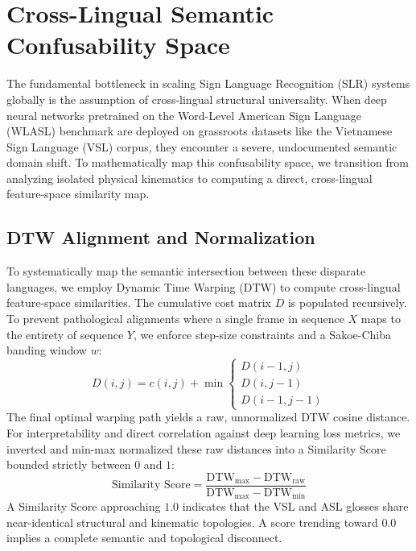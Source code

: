 \documentclass{ieeeaccess}
\begin{document}
\section{Cross-Lingual Semantic Confusability Space} \label{sec:similarity}

The fundamental bottleneck in scaling Sign Language Recognition (SLR) systems globally is the assumption of cross-lingual structural universality. When deep neural networks pretrained on the Word-Level American Sign Language (WLASL) benchmark are deployed on grassroots datasets like the Vietnamese Sign Language (VSL) corpus, they encounter a severe, undocumented semantic domain shift. To mathematically map this confusability space, we transition from analyzing isolated physical kinematics to computing a direct, cross-lingual feature-space similarity map.

\subsection{DTW Alignment and Normalization}
To systematically map the semantic intersection between these disparate languages, we employ Dynamic Time Warping (DTW) \cite{sakoe1978dynamic} to compute cross-lingual feature-space similarities. The cumulative cost matrix $D$ is populated recursively. To prevent pathological alignments where a single frame in sequence $X$ maps to the entirety of sequence $Y$, we enforce step-size constraints and a Sakoe-Chiba banding window $w$: 
\begin{equation} \label{eq:dtw_matrix}
D(i, j) = c(i, j) + \min \begin{cases} D(i-1, j) \\ D(i, j-1) \\ D(i-1, j-1) \end{cases} 
\end{equation}
The final optimal warping path yields a raw, unnormalized DTW cosine distance. For interpretability and direct correlation against deep learning loss metrics, we inverted and min-max normalized these raw distances into a Similarity Score bounded strictly between $0$ and $1$: 
\begin{equation} \label{eq:dtwsim} 
\text{Similarity Score} = \frac{\text{DTW}_{\max} - \text{DTW}_{\text{raw}}}{\text{DTW}_{\max} - \text{DTW}_{\min}} 
\end{equation} 
A Similarity Score approaching $1.0$ indicates that the VSL and ASL glosses share near-identical structural and kinematic topologies. A score trending toward $0.0$ implies a complete semantic and topological disconnect.
\end{document}
